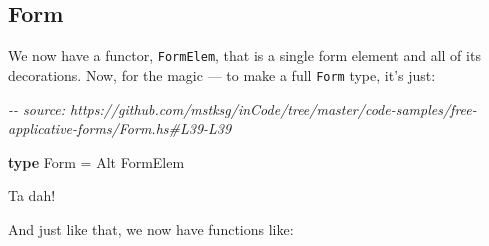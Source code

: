 \documentclass[]{article}
\newenvironment{Shaded}{}{}
\newcommand{\CommentTok}[1]{\textcolor[rgb]{0.38,0.63,0.69}{\textit{#1}}}
\newcommand{\DataTypeTok}[1]{\textcolor[rgb]{0.56,0.13,0.00}{#1}}
\newcommand{\KeywordTok}[1]{\textcolor[rgb]{0.00,0.44,0.13}{\textbf{#1}}}
\newcommand{\OtherTok}[1]{\textcolor[rgb]{0.00,0.44,0.13}{#1}}
\begin{document}
\subsection{Form}\label{form}

We now have a functor, \texttt{FormElem}, that is a single form element and all
of its decorations. Now, for the magic --- to make a full \texttt{Form} type,
it's just:

\begin{Shaded}
\begin{Highlighting}[]
\CommentTok{{-}{-} source: https://github.com/mstksg/inCode/tree/master/code{-}samples/free{-}applicative{-}forms/Form.hs\#L39{-}L39}

\KeywordTok{type} \DataTypeTok{Form} \OtherTok{=} \DataTypeTok{Alt} \DataTypeTok{FormElem}
\end{Highlighting}
\end{Shaded}

Ta dah!

And just like that, we now have functions like:
\end{document}
